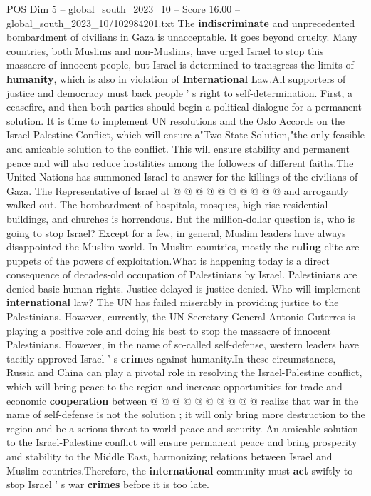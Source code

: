 \begin{textsample}{POS Dim 5 – global\_south\_2023\_10 – Score 16.00 – global\_south\_2023\_10/102984201.txt}
The \textbf{indiscriminate} and unprecedented bombardment of civilians in Gaza is unacceptable.
It goes beyond cruelty.
Many countries, both Muslims and non-Muslims, have urged Israel to stop this massacre of innocent people, but Israel is determined to transgress the limits of \textbf{humanity}, which is also in violation of \textbf{International} Law.All supporters of justice and democracy must back people ' s right to self-determination.
First, a ceasefire, and then both parties should begin a political dialogue for a permanent solution.
It is time to implement UN resolutions and the Oslo Accords on the Israel-Palestine Conflict, which will ensure a"Two-State Solution,"the only feasible and amicable solution to the conflict.
This will ensure stability and permanent peace and will also reduce hostilities among the followers of different faiths.The United Nations has summoned Israel to answer for the killings of the civilians of Gaza.
The Representative of Israel at @ @ @ @ @ @ @ @ @ @ and arrogantly walked out.
The bombardment of hospitals, mosques, high-rise residential buildings, and churches is horrendous.
But the million-dollar question is, who is going to stop Israel?
Except for a few, in general, Muslim leaders have always disappointed the Muslim world.
In Muslim countries, mostly the \textbf{ruling} elite are puppets of the powers of exploitation.What is happening today is a direct consequence of decades-old occupation of Palestinians by Israel.
Palestinians are denied basic human rights.
Justice delayed is justice denied.
Who will implement \textbf{international} law?
The UN has failed miserably in providing justice to the Palestinians.
However, currently, the UN Secretary-General Antonio Guterres is playing a positive role and doing his best to stop the massacre of innocent Palestinians.
However, in the name of so-called self-defense, western leaders have tacitly approved Israel ' s \textbf{crimes} against humanity.In these circumstances, Russia and China can play a pivotal role in resolving the Israel-Palestine conflict, which will bring peace to the region and increase opportunities for trade and economic \textbf{cooperation} between @ @ @ @ @ @ @ @ @ @ realize that war in the name of self-defense is not the solution ; it will only bring more destruction to the region and be a serious threat to world peace and security.
An amicable solution to the Israel-Palestine conflict will ensure permanent peace and bring prosperity and stability to the Middle East, harmonizing relations between Israel and Muslim countries.Therefore, the \textbf{international} community must \textbf{act} swiftly to stop Israel ' s war \textbf{crimes} before it is too late.

\end{textsample}
